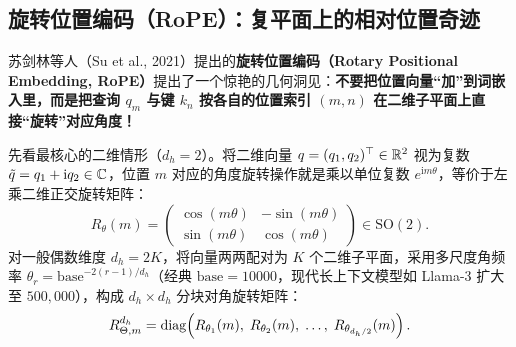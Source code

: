 \subsection{旋转位置编码（RoPE）：复平面上的相对位置奇迹}

苏剑林等人（Su et al., 2021）提出的\textbf{旋转位置编码（Rotary Positional Embedding, RoPE）}提出了一个惊艳的几何洞见：\textbf{不要把位置向量“加”到词嵌入里，而是把查询 $q_m$ 与键 $k_n$ 按各自的位置索引 $(m, n)$ 在二维子平面上直接“旋转”对应角度！}

先看最核心的二维情形（$d_h = 2$）。将二维向量 $q = (q_1, q_2)^\top \in \mathbb{R}^2$ 视为复数 $\tilde{q} = q_1 + \mathrm{i} q_2 \in \mathbb{C}$，位置 $m$ 对应的角度旋转操作就是乘以单位复数 $e^{\mathrm{i} m \theta}$，等价于左乘二维正交旋转矩阵：
\begin{equation}
  R_\theta(m) = \begin{pmatrix}
    \cos(m\theta) & -\sin(m\theta) \\
    \sin(m\theta) & \cos(m\theta)
  \end{pmatrix} \in \mathrm{SO}(2).
  \label{eq:rope-2d}
\end{equation}
对一般偶数维度 $d_h = 2K$，将向量两两配对为 $K$ 个二维子平面，采用多尺度角频率 $\theta_r = \text{base}^{-2(r-1)/d_h}$（经典 $\text{base} = 10000$，现代长上下文模型如 Llama-3 扩大至 $500{,}000$），构成 $d_h \times d_h$ 分块对角旋转矩阵：
\begin{equation}
  R_{\Theta, m}^{d_h} = \operatorname{diag}\!\left(R_{\theta_1}(m),\; R_{\theta_2}(m),\; \dots,\; R_{\theta_{d_h/2}}(m)\right).
  \label{eq:rope-nd}
\end{equation}

